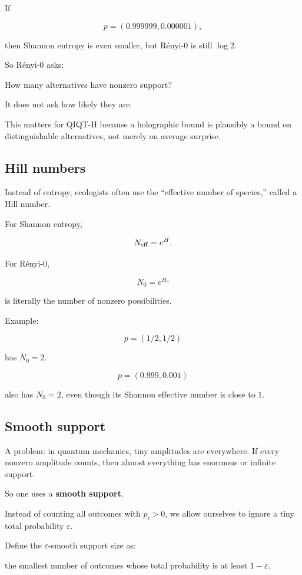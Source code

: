 \documentclass[11pt,a4paper]{article}
\newenvironment{qiqtquote}{\begin{mdframed}[style=quotestyle]}{\end{mdframed}}
\begin{document}
If

\[
p=(0.999999,0.000001),
\]

then Shannon entropy is even smaller, but Rényi-0 is still $\log 2$.

So Rényi-0 asks:

\begin{qiqtquote}
How many alternatives have nonzero support?
\end{qiqtquote}

It does not ask how likely they are.

This matters for QIQT-H because a holographic bound is plausibly a bound on distinguishable alternatives, not merely on average surprise.

\subsection{Hill numbers}

Instead of entropy, ecologists often use the “effective number of species,” called a Hill number.

For Shannon entropy,

\[
N_{\rm eff}=e^{H}.
\]

For Rényi-0,

\[
N_0 = e^{H_0}
\]

is literally the number of nonzero possibilities.

Example:

\[
p=(1/2,1/2)
\]

has $N_0=2$.

\[
p=(0.999,0.001)
\]

also has $N_0=2$, even though its Shannon effective number is close to $1$.

\subsection{Smooth support}

A problem: in quantum mechanics, tiny amplitudes are everywhere. If every nonzero amplitude counts, then almost everything has enormous or infinite support.

So one uses a \textbf{smooth support}.

Instead of counting all outcomes with $p_i>0$, we allow ourselves to ignore a tiny total probability $\varepsilon$.

Define the $\varepsilon$-smooth support size as:

\begin{qiqtquote}
the smallest number of outcomes whose total probability is at least $1-\varepsilon$.
\end{qiqtquote}
\end{document}

